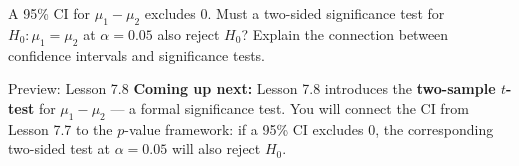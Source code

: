 \documentclass[10pt]{article}
\begin{document}
\begin{extensionbox}
A 95\% CI for $\mu_1 - \mu_2$ excludes 0. Must a two-sided significance test for
$H_0: \mu_1 = \mu_2$ at $\alpha = 0.05$ also reject $H_0$? Explain the connection
between confidence intervals and significance tests.
\end{extensionbox}

\begin{notesbox}{Preview: Lesson 7.8}
\textbf{Coming up next:} Lesson 7.8 introduces the \textbf{two-sample $t$-test} for
$\mu_1 - \mu_2$ --- a formal significance test. You will connect the CI from Lesson 7.7
to the $p$-value framework: if a 95\% CI excludes 0, the corresponding two-sided test
at $\alpha = 0.05$ will also reject $H_0$.
\end{notesbox}
\end{document}
